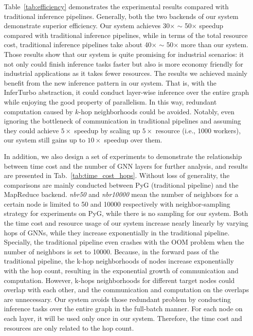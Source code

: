 \documentclass[conference]{IEEEtran}
\begin{document}
Table~\ref{tab:efficiency} demonstrates the experimental results compared with traditional inference pipelines.
Generally,  both the two backends of our system demonstrate superior efficiency.
Our system achieves 30$\times$ $\sim$ 50$\times$ speedup compared with traditional inference pipelines, while in terms of the total resource cost, traditional inference pipelines take about 40$\times$ $\sim$ 50$\times$ more than our system.
Those results show that our system is quite promising for industrial scenarios: it not only could finish inference tasks faster but also is more economy friendly for industrial applications as it takes fewer resources.
The results we achieved mainly benefit from the new inference pattern in our system.
That is, with the InferTurbo abstraction, it could conduct layer-wise inference over the entire graph while enjoying the good property of parallelism.
In this way, redundant computation caused by $k$-hop neighborhoods could be avoided.
Notably, even ignoring the bottleneck of communication in traditional pipelines and assuming they could achieve $5\times$ speedup by scaling up $5\times$ resource (i.e., 1000 workers), our system still gains up to $10\times$ speedup over them.

In addition, we also design a set of experiments to demonstrate the relationship between time cost and the number of GNN layers for further analysis, and results are presented in Tab.~\ref{tab:time_cost_hops}. 
Without loss of generality, the comparisons are mainly conducted between PyG (traditional pipeline) and the MapReduce backend.
\emph{nbr50} and \emph{nbr10000} mean the number of neighbors for a certain node is limited to 50 and 10000 respectively with neighbor-sampling strategy for experiments on PyG, while there is no sampling for our system.
Both the time cost and resource usage of our system increase nearly linearly by varying hops of GNNs, while they increase exponentially in the traditional pipeline.
Specially, the traditional pipeline even crashes with the OOM problem when the number of neighbors is set to 10000.
Because, in the forward pass of the traditional pipeline, the k-hop neighborhoods of nodes increase exponentially with the hop count, resulting in the exponential growth of communication and computation.
However, k-hops neighborhoods for different target nodes could overlap with each other, and the communication and computation on the overlaps are unnecessary.
Our system avoids those redundant problem by conducting inference tasks over the entire graph in the full-batch manner.
For each node on each layer, it will be used only once in our system.
Therefore, the time cost and resources are only related to the hop count.
\end{document}
